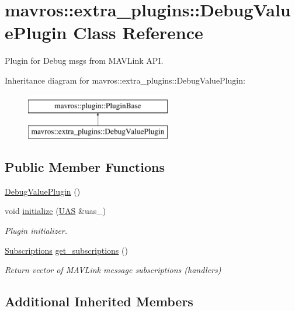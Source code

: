\hypertarget{classmavros_1_1extra__plugins_1_1DebugValuePlugin}{}\section{mavros\+::extra\+\_\+plugins\+::Debug\+Value\+Plugin Class Reference}
\label{classmavros_1_1extra__plugins_1_1DebugValuePlugin}


Plugin for Debug msgs from M\+A\+V\+Link A\+PI.  


Inheritance diagram for mavros\+::extra\+\_\+plugins\+::Debug\+Value\+Plugin\+:\begin{figure}[H]
\begin{center}
\leavevmode
\includegraphics[height=2.000000cm]{classmavros_1_1extra__plugins_1_1DebugValuePlugin}
\end{center}
\end{figure}
\subsection*{Public Member Functions}
\begin{DoxyCompactItemize}
\item 
\mbox{\hyperlink{group__plugin_gaad8fc784bbe6fddeae69c2347b40bdc8}{Debug\+Value\+Plugin}} ()
\item 
void \mbox{\hyperlink{group__plugin_ga2f1235653fca1e9789a8e0842db27743}{initialize}} (\mbox{\hyperlink{classmavros_1_1UAS}{U\+AS}} \&uas\+\_\+)
\begin{DoxyCompactList}\small\item\em Plugin initializer. \end{DoxyCompactList}\item 
\mbox{\hyperlink{group__plugin_ga8967d61fc77040e0c3ea5a4585d62a09}{Subscriptions}} \mbox{\hyperlink{group__plugin_ga9ae270242b82f1aebfcccc109c008be1}{get\+\_\+subscriptions}} ()
\begin{DoxyCompactList}\small\item\em Return vector of M\+A\+V\+Link message subscriptions (handlers) \end{DoxyCompactList}\end{DoxyCompactItemize}
\subsection*{Additional Inherited Members}



